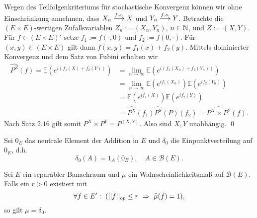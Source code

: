 \begin{proof*}%
    Wegen des Teilfolgenkriteriums für stochastische Konvergenz können wir ohne Einschränkung annehmen, dass $X_n \overset{f.s.}{\longrightarrow} X$ und $Y_n \overset{f.s.}{\longrightarrow} Y$. 
    Betrachte die $(E \times E)$-wertigen Zufallsvariablen $Z_n:=(X_n,Y_n)$, $n \in \mathbb{N}$, und $Z:=(X,Y)$. 
    Für $f \in (E \times E)'$ setze $f_1 := f(\cdot, 0)$ und $f_2 := f(0, \cdot)$. Für $(x,y) \in (E \times E)$ gilt dann $f(x,y) = f_1(x) + f_2(y)$.
    Mittels dominierter Konvergenz und dem Satz von Fubini erhalten wir 
    \begin{align*}
        \widehat{P^Z}(f) = \mathbb{E}(e^{i(f_1(X) + f_2(Y))}) &= \lim_{n \to \infty}\mathbb{E}(e^{i(f_1(X_n) + f_2(Y_n))})  \\\
                                                       &= \lim_{n \to \infty}\mathbb{E}(e^{if_1(X_n)})\mathbb{E}(e^{if_2(Y_n)}) \\\
                                                       &= \mathbb{E}(e^{if_1(X)})\mathbb{E}(e^{if_2(Y)})  \\\
                                                       &= \widehat{P^X}(f_1)\widehat{P^Y}(P)(f_2) = \widehat{P^X \times P^Y}(f).
    \end{align*}
    Nach Satz $2.16$ gilt somit $P^X \times P^Y = P^{(X,Y)}$. Also sind $X,Y$ unabhängig. \qed
\end{proof*}

Sei $0_E$ das neutrale Element der Addition in $E$ und $\delta_0$ die Einpunktverteilung auf $0_E$, d.h. 
$$
    \delta_0(A) = 1_A(0_E), \quad A \in \mathcal{B}(E). 
$$

\begin{proposition}
    Sei $E$ ein separabler Banachraum und $\mu$ ein Wahrscheinlichkeitsmaß auf $\mathcal{B}(E)$. Falls ein $r > 0$ existiert mit
    $$
       \forall f \in E': \ ( \lvert\lvert f \rvert\rvert_{op} \leq r \ \Rightarrow \ \widehat{\mu}(f) = 1),
    $$
    so gilt $\mu = \delta_0$. 
\end{proposition}

